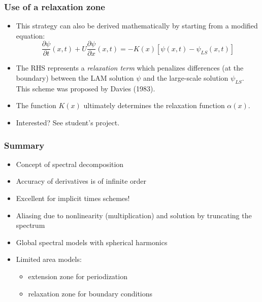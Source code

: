 \documentclass[aspectratio=149,9pt]{beamer}
\begin{document}
\begin{frame}
	\frametitle{Use of a relaxation zone}
	\vfill\begin{itemize}
		\item This strategy can also be derived mathematically by starting from a modified equation:
			\begin{equation*}
				\frac{\partial \psi}{\partial t} (x,t) + U \frac{\partial \psi}{\partial x} (x,t) = 
				- K(x) \left[ \psi (x,t) - \psi_{LS} (x,t) \right]
			\end{equation*}\vfill
		\item The RHS represents a \emph{relaxation term} which penalizes differences (at the boundary) between the LAM solution $\psi$ and the large-scale solution $\psi_{LS}$. This scheme was proposed by Davies (1983).\vfill
		\item The function $K(x)$ ultimately determines the relaxation function $\alpha(x)$.\vfill
		\item Interested? See student's project.
	\end{itemize}\vfill
\end{frame}
%
%
\begin{frame}
	\frametitle{Summary}
	\vfill\begin{itemize}
		\item Concept of spectral decomposition\vfill
		\item Accuracy of derivatives is of infinite order\vfill
		\item Excellent for implicit times schemes!\vfill
		\item Aliasing due to nonlinearity (multiplication) and solution by truncating the spectrum\vfill
		\item Global spectral models with spherical harmonics\vfill
		\item Limited area models:
			\begin{itemize}
				\item extension zone for periodization
				\item relaxation zone for boundary conditions
			\end{itemize}
	\end{itemize}\vfill
\end{frame}
%
%
\end{document}

